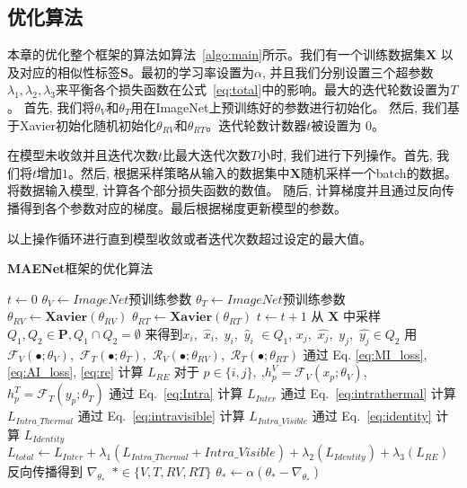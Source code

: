 \subsection{优化算法}
本章的优化整个框架的算法如算法~\ref{algo:main}所示。我们有一个训练数据集$\mathbf{X}$ 以及对应的相似性标签$\mathbf{S}$。最初的学习率设置为$\alpha$, 并且我们分别设置三个超参数$\lambda_1, \lambda_2, \lambda_3$来平衡各个损失函数在公式~\ref{eq:total}中的影响。最大的迭代轮数设置为$T$。 首先, 我们将$\theta_{V}$和$\theta_{T}$用在ImageNet上预训练好的参数进行初始化。 然后, 我们基于Xavier初始化随机初始化$\theta_{RV}$和$\theta_{RT}$。迭代轮数计数器$t$被设置为 $0$。 \par
在模型未收敛并且迭代次数$t$比最大迭代次数$T$小时, 我们进行下列操作。首先, 我们将$t$增加$1$。然后, 根据采样策略从输入的数据集中$\mathbf{X}$随机采样一个batch的数据。将数据输入模型, 计算各个部分损失函数的数值。
随后, 计算梯度并且通过反向传播得到各个参数对应的梯度。最后根据梯度更新模型的参数。\par
以上操作循环进行直到模型收敛或者迭代次数超过设定的最大值。


\begin{algorithm}
  \caption{\textbf{MAENet}框架的优化算法}\label{algo:main}
  $t \leftarrow 0$\;
  $\theta_V \leftarrow ImageNet预训练参数$  \; 
  $\theta_T \leftarrow ImageNet预训练参数$  \; 
  $\theta_{RV} \leftarrow \textbf{Xavier}(\theta_{RV})$  \; 
  $\theta_{RT} \leftarrow \textbf{Xavier}(\theta_{RT})$  \; 
  {
    $t \leftarrow t +1 $\;
   从 $\mathbf{X}$ 中采样 $Q_1, Q_2 \in \mathbf{P}, Q_1 \cap Q_2 = \emptyset $ 来得到$x_i$,~$\hat{x}_i$,~$y_i$,~$\hat{y}_i$ $\in  Q_1$, $x_j$,~$\hat{x_j}$,~${y_j}$,~$\hat{y_j} \in Q_2$ \;
   用 ~$\mathcal{F}_V(\bullet;\theta_V)$,~$\mathcal{F}_T(\bullet;\theta_T)$,~$\mathcal{R}_V(\bullet;\theta_{RV})$,~$\mathcal{R}_T(\bullet;\theta_{RT})$ 通过 Eq. \ref{eq:MI_loss}, \ref{eq:AI_loss}, \ref{eq:re} 计算 $L_{RE}$  \;
   对于 $p \in \{i, j\},~$,$h_p^V = \mathcal{F}_V(x_p;\theta_V)$, $h_p^T = \mathcal{F}_T(y_p;\theta_T)$ \;
   通过 Eq.~\ref{eq:Intra} 计算 $L_{Inter}$ \;
   通过 Eq.~\ref{eq:intrathermal} 计算 $L_{Intra\_Thermal}$ \;
   通过 Eq.~\ref{eq:intravisible} 计算 $L_{Intra\_Visible}$ \;
   通过 Eq.~\ref{eq:identity} 计算 $L_{Identity}$ \;
   $L_{total} \leftarrow L_{Inter} + \lambda_1 (L_{Intra\_Thermal} + Intra\_Visible) + \lambda_2 (L_{Identity}) + \lambda_3 (L_{RE}) $ \;
   反向传播得到 $\nabla_{\theta_*}$~$*\in \{V, T, RV, RT\}$ \;
  $\theta_* \leftarrow \alpha ( \theta_* - \nabla_{\theta_*}) $ \;
  }
 
  \end{algorithm}

